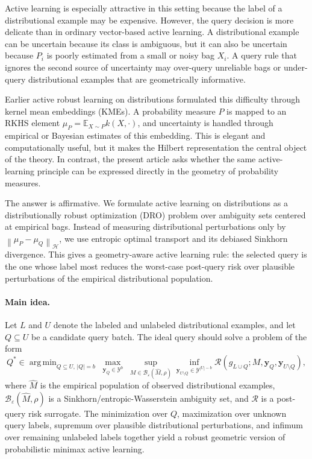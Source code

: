 \documentclass[11pt,a4paper]{article}
\DeclareMathOperator*{\argmin}{arg\,min}
\newcommand{\E}{\mathbb{E}}
\newcommand{\cY}{\mathcal{Y}}
\newcommand{\cH}{\mathcal{H}}
\newcommand{\cB}{\mathcal{B}}
\newcommand{\norm}[1]{\left\lVert #1\right\rVert}
\begin{document}
Active learning is especially attractive in this setting because the label of a distributional example may be expensive. However, the query decision is more delicate than in ordinary vector-based active learning. A distributional example can be uncertain because its class is ambiguous, but it can also be uncertain because $P_i$ is poorly estimated from a small or noisy bag $X_i$. A query rule that ignores the second source of uncertainty may over-query unreliable bags or under-query distributional examples that are geometrically informative.

Earlier active robust learning on distributions formulated this difficulty through kernel mean embeddings (KMEs). A probability measure $P$ is mapped to an RKHS element $\mu_P=\E_{X\sim P}k(X,\cdot)$, and uncertainty is handled through empirical or Bayesian estimates of this embedding. This is elegant and computationally useful, but it makes the Hilbert representation the central object of the theory. In contrast, the present article asks whether the same active-learning principle can be expressed directly in the geometry of probability measures.

The answer is affirmative. We formulate active learning on distributions as a distributionally robust optimization (DRO) problem over ambiguity sets centered at empirical bags. Instead of measuring distributional perturbations only by $\norm{\mu_P-\mu_Q}_{\cH}$, we use entropic optimal transport and its debiased Sinkhorn divergence. This gives a geometry-aware active learning rule: the selected query is the one whose label most reduces the worst-case post-query risk over plausible perturbations of the empirical distributional population.

\paragraph{Main idea.}
Let $L$ and $U$ denote the labeled and unlabeled distributional examples, and let $Q\subseteq U$ be a candidate query batch. The ideal query should solve a problem of the form
\begin{equation}
Q^*\in \argmin_{Q\subseteq U,\,|Q|=b}\;
\max_{\bm y_Q\in\cY^b}\;
\sup_{M\in\cB_\varepsilon(\widehat M,\rho)}
\inf_{\bm y_{U\setminus Q}\in\cY^{|U|-b}}
\mathcal{R}(g_{L\cup Q};M,\bm y_Q,\bm y_{U\setminus Q}),
\label{eq:ideal-sinkhorn-pmal}
\end{equation}
where $\widehat M$ is the empirical population of observed distributional examples, $\cB_\varepsilon(\widehat M,\rho)$ is a Sinkhorn/entropic-Wasserstein ambiguity set, and $\mathcal{R}$ is a post-query risk surrogate. The minimization over $Q$, maximization over unknown query labels, supremum over plausible distributional perturbations, and infimum over remaining unlabeled labels together yield a robust geometric version of probabilistic minimax active learning.
\end{document}
